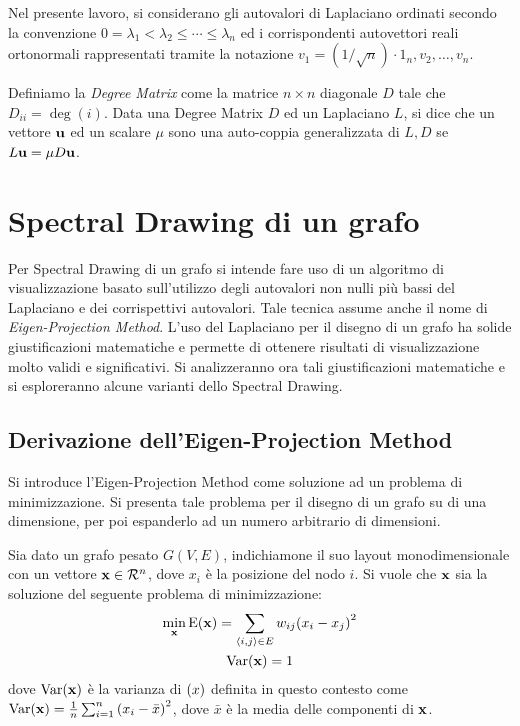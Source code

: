 \documentclass[10pt,a4paper]{article}
\newcommand{\Var}{\mathrm{Var}}
\newcommand{\E}{\mathrm{E}}
\begin{document}
Nel presente lavoro, si considerano gli autovalori di Laplaciano ordinati secondo la convenzione \(0 = \lambda_1 < \lambda_2 \leq \cdots \leq \lambda_n\) ed i corrispondenti autovettori reali ortonormali rappresentati tramite la notazione \(v_1 = (1/\sqrt{n})\cdot 1_n, v_2, \ldots, v_n\).

Definiamo la \textit{Degree Matrix} come la matrice \(n\times n\) diagonale \(D\) tale che \(D_{ii} = \deg(i)\).
Data una Degree Matrix \(D\) ed un Laplaciano \(L\), si dice che un vettore \(\vb{u}\) ed un scalare \(\mu \) sono una auto-coppia generalizzata di \(L,D\) se \(L\vb{u}=\mu D \vb{u}\).

\section{Spectral Drawing di un grafo}\label{sec:spectral_drawing}

Per Spectral Drawing di un grafo si intende fare uso di un algoritmo di visualizzazione basato sull'utilizzo degli autovalori non nulli più bassi del Laplaciano e dei corrispettivi autovalori. Tale tecnica assume anche il nome di \textit{Eigen-Projection Method}.
L'uso del Laplaciano per il disegno di un grafo ha solide giustificazioni matematiche e permette di ottenere risultati di visualizzazione molto validi e significativi.
Si analizzeranno ora tali giustificazioni matematiche e si esploreranno alcune varianti dello Spectral Drawing.

\subsection{Derivazione dell'Eigen-Projection Method}\label{subsec:eigen-projection}

Si introduce l'Eigen-Projection Method come soluzione ad un problema di minimizzazione. Si presenta tale problema per il disegno di un grafo su di una dimensione, per poi espanderlo ad un numero arbitrario di dimensioni.

Sia dato un grafo pesato \(G(V,E)\), indichiamone il suo layout monodimensionale con un vettore \(\vb{x} \in \mathcal{R}^n\), dove \(x_i\) è la posizione del nodo \(i\). Si vuole che \(\vb{x}\) sia la soluzione del seguente problema di minimizzazione:
\begin{gather}
    \min_{\vb{x}} \E(\vb{x}) = \sum_{\langle i, j\rangle \in E} w_{ij}{(x_i - x_j)}^2 \label{eq:minimization}\\
    \Var(\vb{x}) = 1
\end{gather}
dove \(\Var(\vb{x})\) è la varianza di \(\vb(x)\) definita in questo contesto come \(\Var(\vb{x}) = \frac{1}{n}\sum_{i=1}^n {(x_i - \bar{x})}^2\), dove \(\bar{x}\) è la media delle componenti di \(\vb{x}\).
\end{document}
